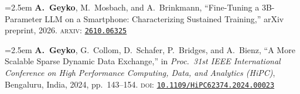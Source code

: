 \smallskip

\noindent\hangindent=2.5em%
\textbf{A.~Geyko}, M.~Mosbach, and A.~Brinkmann, ``Fine-Tuning a 3B-Parameter LLM on a Smartphone: Characterizing Sustained Training,'' arXiv preprint, 2026. \textsc{arxiv}: \href{https://arxiv.org/abs/2610.06325}{\texttt{2610.06325}}
\par\medskip

\noindent\hangindent=2.5em%
\textbf{A.~Geyko}, G.~Collom, D.~Schafer, P.~Bridges, and A.~Bienz, ``A More Scalable Sparse Dynamic Data Exchange,'' in \emph{Proc.\ 31st IEEE International Conference on High Performance Computing, Data, and Analytics (HiPC)}, Bengaluru, India, 2024, pp.~143--154. \textsc{doi}: \href{https://doi.org/10.1109/HiPC62374.2024.00023}{\texttt{10.1109/HiPC62374.2024.00023}}
\par
